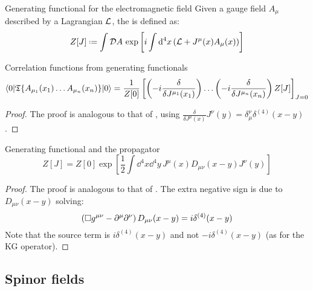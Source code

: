 \begin{definition}{Generating functional for the electromagnetic field}{}
  Given a gauge field $ A_\mu $ described by a Lagrangian $ \mathcal{L} $, the  is defined as:
  \begin{equation}
    Z[J] \defeq \int \mathcal{D}A\, \exp \left[ i \int \dd^4x \left( \lag + J^\mu(x) A_\mu(x) \right) \right]
  \end{equation}
\end{definition}

\begin{lemma}[before upper = {\tcbtitle}]{Correlation functions from generating functionals}{}
  \begin{equation}
    \braket{0 | \mathfrak{T}\{A_{\mu_1}(x_1) \dots A_{\mu_n}(x_n)\} | 0} = \frac{1}{Z[0]} \left[ \left( -i \frac{\delta}{\delta J^{\mu_1}(x_1)} \right) \dots \left( -i \frac{\delta}{\delta J^{\mu_n}(x_n)} \right) Z[J] \right]_{J = 0}
  \end{equation}
\end{lemma}

\begin{proofbox}
  \begin{proof}
    The proof is analogous to that of , using $ \frac{\delta}{\delta J^\mu(x)} J^\nu(y) = \delta^\nu_\mu \delta^{(4)}(x-y) $.
  \end{proof}
\end{proofbox}

\begin{proposition}[before upper = {\tcbtitle}]{Generating functional and the propagator}{}
  \begin{equation}
    Z[J] = Z[0] \exp \left[ \frac{1}{2} \int \dd^4x \dd^4y\, J^\mu(x) D_{\mu \nu}(x-y) J^\nu(y) \right]
  \end{equation}
\end{proposition}

\begin{proofbox}
  \begin{proof}
    The proof is analogous to that of . The extra negative sign is due to $ D_{\mu \nu}(x-y) $ solving:
    \begin{equation}
      \left( \Box g^{\mu \nu} - \partial^\mu \partial^\nu \right) D_{\mu \nu}(x-y) = i \delta^{(4)}(x-y)
    \end{equation}
    Note that the source term is $ i \delta^{(4)}(x-y) $ and not $ -i \delta^{(4)}(x-y) $ (as for the KG operator).
  \end{proof}
\end{proofbox}

\subsection{Spinor fields}











